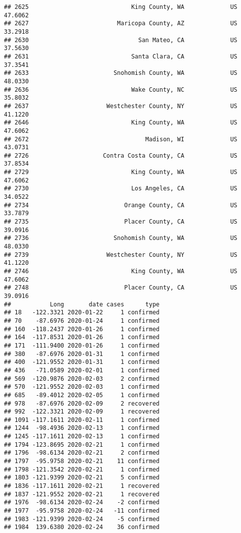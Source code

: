 \documentclass[
]{article}
\begin{document}
\begin{verbatim}
## 2625                             King County, WA             US 47.6062
## 2627                         Maricopa County, AZ             US 33.2918
## 2630                               San Mateo, CA             US 37.5630
## 2631                             Santa Clara, CA             US 37.3541
## 2633                        Snohomish County, WA             US 48.0330
## 2636                             Wake County, NC             US 35.8032
## 2637                      Westchester County, NY             US 41.1220
## 2646                             King County, WA             US 47.6062
## 2672                                 Madison, WI             US 43.0731
## 2726                     Contra Costa County, CA             US 37.8534
## 2729                             King County, WA             US 47.6062
## 2730                             Los Angeles, CA             US 34.0522
## 2734                           Orange County, CA             US 33.7879
## 2735                           Placer County, CA             US 39.0916
## 2736                        Snohomish County, WA             US 48.0330
## 2739                      Westchester County, NY             US 41.1220
## 2746                             King County, WA             US 47.6062
## 2748                           Placer County, CA             US 39.0916
##           Long       date cases      type
## 18   -122.3321 2020-01-22     1 confirmed
## 70    -87.6976 2020-01-24     1 confirmed
## 160  -118.2437 2020-01-26     1 confirmed
## 164  -117.8531 2020-01-26     1 confirmed
## 171  -111.9400 2020-01-26     1 confirmed
## 380   -87.6976 2020-01-31     1 confirmed
## 400  -121.9552 2020-01-31     1 confirmed
## 436   -71.0589 2020-02-01     1 confirmed
## 569  -120.9876 2020-02-03     2 confirmed
## 570  -121.9552 2020-02-03     1 confirmed
## 685   -89.4012 2020-02-05     1 confirmed
## 978   -87.6976 2020-02-09     2 recovered
## 992  -122.3321 2020-02-09     1 recovered
## 1091 -117.1611 2020-02-11     1 confirmed
## 1244  -98.4936 2020-02-13     1 confirmed
## 1245 -117.1611 2020-02-13     1 confirmed
## 1794 -123.8695 2020-02-21     1 confirmed
## 1796  -98.6134 2020-02-21     2 confirmed
## 1797  -95.9758 2020-02-21    11 confirmed
## 1798 -121.3542 2020-02-21     1 confirmed
## 1803 -121.9399 2020-02-21     5 confirmed
## 1836 -117.1611 2020-02-21     1 recovered
## 1837 -121.9552 2020-02-21     1 recovered
## 1976  -98.6134 2020-02-24    -2 confirmed
## 1977  -95.9758 2020-02-24   -11 confirmed
## 1983 -121.9399 2020-02-24    -5 confirmed
## 1984  139.6380 2020-02-24    36 confirmed

\end{verbatim}
\end{document}
